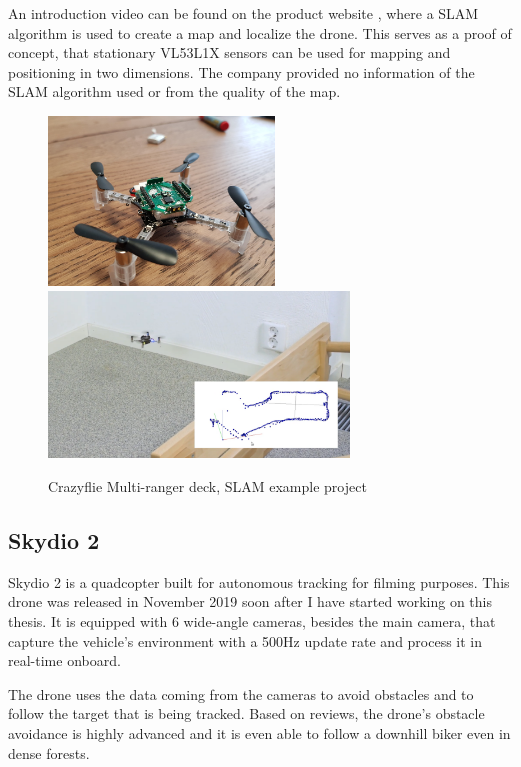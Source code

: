 An introduction video can be found on the product website \cite{BitcrazeMultirangerDeck}, where 
a SLAM algorithm is used to create a map and localize the drone. This serves as a proof of concept,
that stationary VL53L1X sensors can be used for mapping and positioning in two dimensions. The company provided 
no information of the SLAM algorithm used or from the quality of the map.
\newpage
\begin{figure}[h]
    \centering
    \includegraphics[width=60mm, keepaspectratio]{figures/multiranger_deck.jpg}
    \includegraphics[width=80mm, keepaspectratio]{figures/multiranger_slam.png}
    \caption{Crazyflie Multi-ranger deck, SLAM example project}
    \label{fig:crazyflie_multiranger}
\end{figure}



\subsection{Skydio 2}
Skydio 2 is a quadcopter built for autonomous tracking for filming purposes. This drone was released 
in November 2019 soon after I have started working on this thesis. It is equipped with 6 wide-angle 
cameras, besides the main camera, that capture the vehicle's environment with a 500Hz update rate and 
process it in real-time onboard. \cite{SkydioWebsite}

The drone uses the data coming from the cameras to avoid obstacles and to follow the target that is 
being tracked. Based on reviews, the drone's obstacle avoidance is highly advanced and it is even able 
to follow a downhill biker even in dense forests. 

